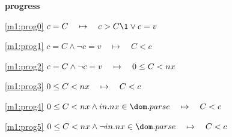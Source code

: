 \textbf{progress}
\begin{block}
\item[ \eqref{m1:prog0} ]{$c = C \quad \mapsto\quad c > C \1\lor c = v$} %
\item[ \eqref{m1:prog1} ]{$c = C \land \neg c = v \quad \mapsto\quad C < c$} %
\item[ \eqref{m1:prog2} ]{$c = C \land \neg c = v \quad \mapsto\quad 0 \le C < nx$} %
\item[ \eqref{m1:prog3} ]{$0 \le C < nx \quad \mapsto\quad C < c$} %
\item[ \eqref{m1:prog4} ]{$\betweenR{0}{C}{nx} \land in.nx \in \dom.parse \quad \mapsto\quad C < c$} %
\item[ \eqref{m1:prog5} ]{$\betweenR{0}{C}{nx} \land \neg in.nx \in \dom.parse \quad \mapsto\quad C < c$} %
\end{block}
